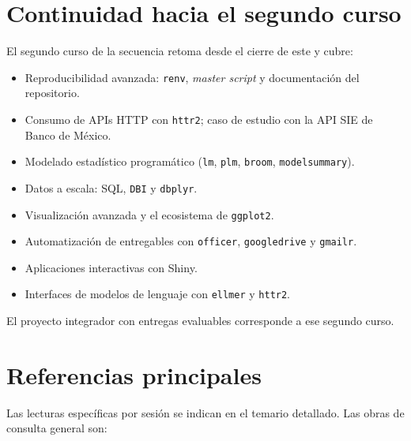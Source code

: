 \documentclass[11pt,letterpaper]{article}
\begin{document}
\section{Continuidad hacia el segundo curso}

El segundo curso de la secuencia retoma desde el cierre de este y cubre:

\begin{itemize}[leftmargin=*, itemsep=1pt]
    \item Reproducibilidad avanzada: \texttt{renv}, \textit{master script} y documentación del repositorio.
    \item Consumo de APIs HTTP con \texttt{httr2}; caso de estudio con la API SIE de Banco de México.
    \item Modelado estadístico programático (\texttt{lm}, \texttt{plm}, \texttt{broom}, \texttt{modelsummary}).
    \item Datos a escala: SQL, \texttt{DBI} y \texttt{dbplyr}.
    \item Visualización avanzada y el ecosistema de \texttt{ggplot2}.
    \item Automatización de entregables con \texttt{officer}, \texttt{googledrive} y \texttt{gmailr}.
    \item Aplicaciones interactivas con Shiny.
    \item Interfaces de modelos de lenguaje con \texttt{ellmer} y \texttt{httr2}.
\end{itemize}

El proyecto integrador con entregas evaluables corresponde a ese segundo curso.

\section{Referencias principales}

Las lecturas específicas por sesión se indican en el temario detallado. Las obras de consulta general son:

\nocite{wickham2023r4ds, wickham2019advr, wickham2016ggplot2, rcoreteam-intro, bryan-happygit}

\printbibliography[heading=none]
\end{document}
